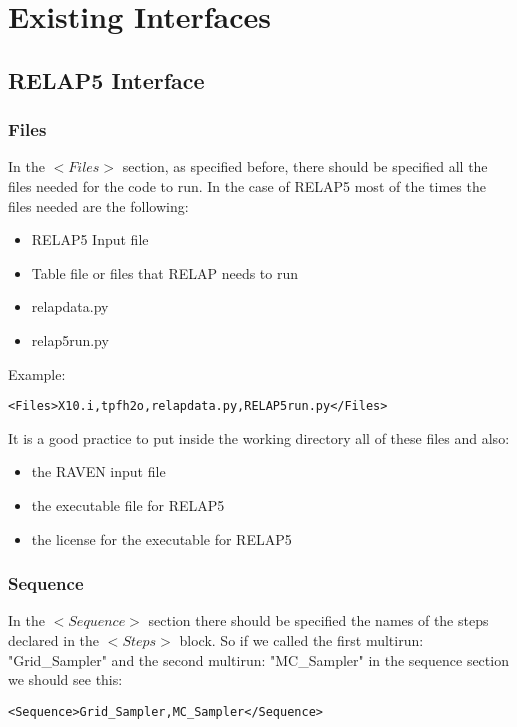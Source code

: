 \section{Existing Interfaces  \\ \vspace{2 mm} {\small }}

\subsection{RELAP5 Interface}


\subsubsection{Files}
In the $<Files>$ section, as specified before, there should be specified all the files needed for the code to run. In the case of RELAP5 most of the times the files needed are the following:
\begin{itemize}
\item RELAP5 Input file
\item Table file or files that RELAP needs to run
\item relapdata.py
\item relap5run.py
\end{itemize}
Example:
\begin{lstlisting}[style=XML]
<Files>X10.i,tpfh2o,relapdata.py,RELAP5run.py</Files>
\end{lstlisting}

It is a good practice to put inside the working directory all of these files and also:
\begin{itemize}
\item the RAVEN input file
\item the executable file for RELAP5
\item the license for the executable for RELAP5
\end{itemize}
\subsubsection{Sequence}
In the $<Sequence>$ section there should be specified the names of the steps declared in the $<Steps>$ block. 
So if we called the first multirun: "Grid\_Sampler" and the second multirun: "MC\_Sampler" in the sequence section we should see this:
\begin{lstlisting}[style=XML]
<Sequence>Grid_Sampler,MC_Sampler</Sequence>
\end{lstlisting}
